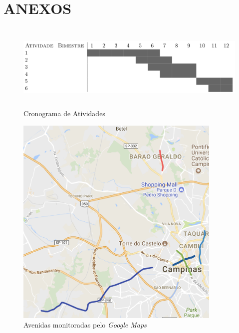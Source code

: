 \section*{ANEXOS}
\begin{figure}[h!]
    \centering
    \includegraphics[height=4.2cm]{imagens/cronograma.png}
    \caption{Cronograma de Atividades}
    \label{fig:cronograma}
\end{figure}

\begin{figure}[h!]
    \centering
    \includegraphics[height=10.2cm]{imagens/avenidas_ic.png}
    \caption{Avenidas monitoradas pelo \emph{Google Maps}}
    \label{fig:avenidas}
\end{figure}

